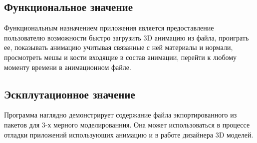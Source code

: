 \subsection{Функциональное значение}
Функциональным назначением приложения является предоставление пользователю возможности быстро загрузить 3D анимацию из файла, проиграть ее, показывать анимацию учитывая связанные с ней материалы и нормали, просмотреть мешы и кости входящие в состав анимации, перейти к любому моменту времени в анимационном файле.

\subsection{Эскплутационное значение}
Программа наглядно демонстрирует содержание файла экпортированного из пакетов для 3-х мерного моделированния. Она может использоваться в процессе отладки приложений использующих анимацию и в работе дизайнера 3D моделей.
